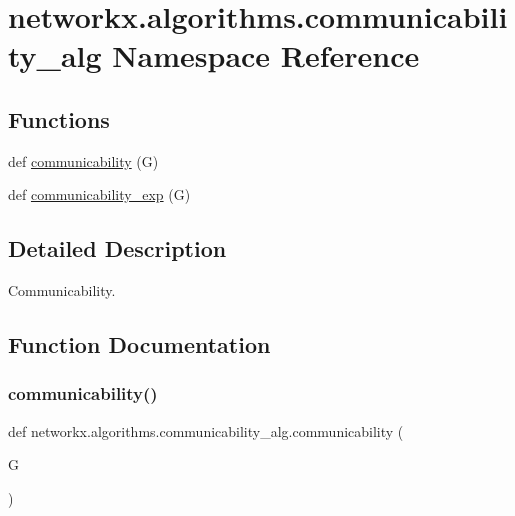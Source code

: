 \hypertarget{namespacenetworkx_1_1algorithms_1_1communicability__alg}{}\section{networkx.\+algorithms.\+communicability\+\_\+alg Namespace Reference}
\label{namespacenetworkx_1_1algorithms_1_1communicability__alg}
\subsection*{Functions}
\begin{DoxyCompactItemize}
\item 
def \hyperlink{namespacenetworkx_1_1algorithms_1_1communicability__alg_a56dd6183dccfe26ea8079f2f1524eb24}{communicability} (G)
\item 
def \hyperlink{namespacenetworkx_1_1algorithms_1_1communicability__alg_ac724a15513044b68fc82f48808b07893}{communicability\+\_\+exp} (G)
\end{DoxyCompactItemize}


\subsection{Detailed Description}
\begin{DoxyVerb}Communicability.
\end{DoxyVerb}
 

\subsection{Function Documentation}
\mbox{\label{namespacenetworkx_1_1algorithms_1_1communicability__alg_a56dd6183dccfe26ea8079f2f1524eb24}} 
\subsubsection{\texorpdfstring{communicability()}{communicability()}}
{\footnotesize\ttfamily def networkx.\+algorithms.\+communicability\+\_\+alg.\+communicability (\begin{DoxyParamCaption}\item[{}]{G }\end{DoxyParamCaption})}

